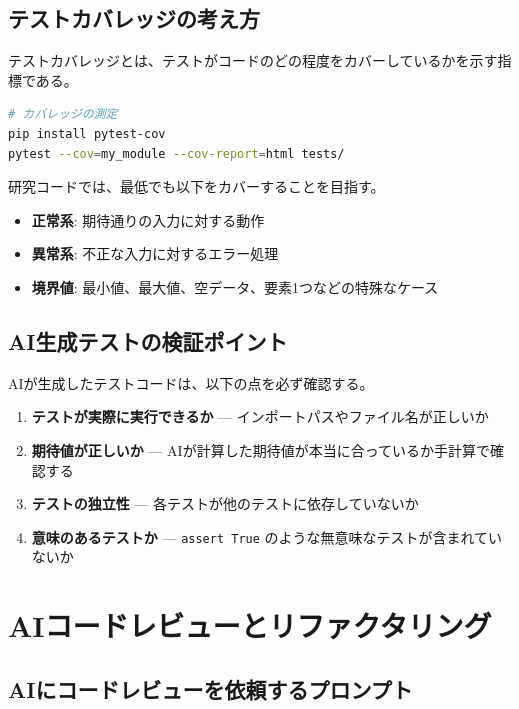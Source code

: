 \subsection{テストカバレッジの考え方}

テストカバレッジとは、テストがコードのどの程度をカバーしているかを示す指標である。

\begin{lstlisting}[language=bash]
# カバレッジの測定
pip install pytest-cov
pytest --cov=my_module --cov-report=html tests/
\end{lstlisting}

研究コードでは、最低でも以下をカバーすることを目指す。

\begin{itemize}
\item \textbf{正常系}: 期待通りの入力に対する動作
\item \textbf{異常系}: 不正な入力に対するエラー処理
\item \textbf{境界値}: 最小値、最大値、空データ、要素1つなどの特殊なケース
\end{itemize}

\subsection{AI生成テストの検証ポイント}

AIが生成したテストコードは、以下の点を必ず確認する。

\begin{enumerate}
\item \textbf{テストが実際に実行できるか} --- インポートパスやファイル名が正しいか
\item \textbf{期待値が正しいか} --- AIが計算した期待値が本当に合っているか手計算で確認する
\item \textbf{テストの独立性} --- 各テストが他のテストに依存していないか
\item \textbf{意味のあるテストか} --- \texttt{assert True} のような無意味なテストが含まれていないか
\end{enumerate}

\section{AIコードレビューとリファクタリング}
\label{sec:6.6}

\subsection{AIにコードレビューを依頼するプロンプト}

